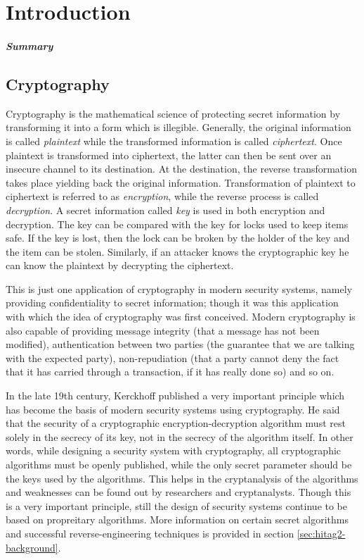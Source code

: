 \chapter{Introduction}
\label{chapter:intro}

\paragraph{Summary}


\section{Cryptography}

Cryptography is the mathematical science of protecting secret information by transforming it into a form which is illegible. Generally, the original information is called \textit{plaintext} while the transformed information is called \textit{ciphertext}. Once plaintext is transformed into ciphertext, the latter can then be sent over an insecure channel to its destination. At the destination, the reverse transformation takes place yielding back the original information. Transformation of plaintext to ciphertext is referred to as \textit{encryption}, while the reverse process is called \textit{decryption}. A secret information called \textit{key} is used in both encryption and decryption. The key can be compared with the key for locks used to keep items safe. If the key is lost, then the lock can be broken by the holder of the key and the item can be stolen. Similarly, if an attacker knows the cryptographic key he can know the plaintext by decrypting the ciphertext.  

This is just one application of cryptography in modern security systems, namely providing confidentiality to secret information; though it was this application with which the idea of cryptography was first conceived. Modern cryptography is also capable of providing message integrity (that a message has not been modified), authentication between two parties (the guarantee that we are talking with the expected party), non-repudiation (that a party cannot deny the fact that it has carried through a transaction, if it has really done so) and so on. 

In the late 19th century, Kerckhoff published a very important principle \cite{kerckhoff} which has become the basis of modern security systems using cryptography. He said that the security of a cryptographic encryption-decryption algorithm must rest solely in the secrecy of its key, not in the secrecy of the algorithm itself. In other words, while designing a security system with cryptography, all cryptographic algorithms must be openly published, while the only secret parameter should be the keys used by the algorithms. This helps in the cryptanalysis of the algorithms and weaknesses can be found out by researchers and cryptanalysts. Though this is a very important principle, still the design of security systems continue to be based on propreitary algorithms. More information on certain secret algorithms and successful reverse-engineering techniques is provided in section \ref{sec:hitag2-background}.

